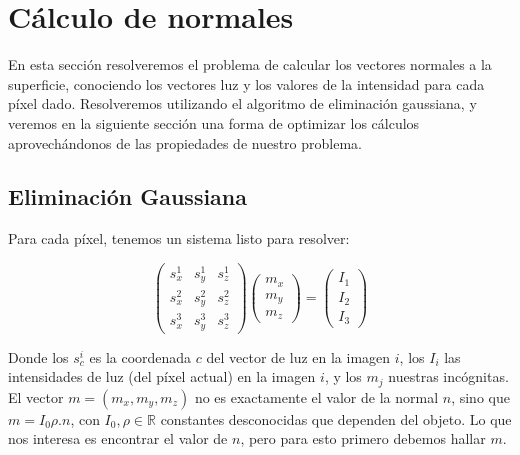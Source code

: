 


\section{Cálculo de normales}

En esta sección resolveremos el problema de calcular los vectores normales a la superficie, conociendo los vectores luz y los valores de la intensidad para cada píxel dado. Resolveremos utilizando el algoritmo de eliminación gaussiana, y veremos en la siguiente sección una forma de optimizar los cálculos aprovechándonos de las propiedades de nuestro problema.

\subsection{Eliminación Gaussiana}

Para cada píxel, tenemos un sistema listo para resolver:

\[
\begin{pmatrix}
    s_{x}^{1} & s_{y}^{1} & s_{z}^{1} \\
    s_{x}^{2} & s_{y}^{2} & s_{z}^{2} \\
    s_{x}^{3} & s_{y}^{3} & s_{z}^{3}
\end{pmatrix}
\begin{pmatrix}
    m_{x} \\
    m_{y} \\
    m_{z}
\end{pmatrix}
=
\begin{pmatrix}
    I_{1} \\
    I_{2} \\
    I_{3}
\end{pmatrix}
\]

Donde los $s_{c}^{i}$ es la coordenada $c$ del vector de luz en la imagen $i$, los $I_i$ las intensidades de luz (del píxel actual) en la imagen $i$, y los $m_j$ nuestras incógnitas. El vector $m = (m_x, m_y, m_z)$ no es exactamente el valor de la normal $n$, sino que $m = I_0 \rho . n$, con $I_0, \rho \in \mathbb{R}$ constantes desconocidas que dependen del objeto. Lo que nos interesa es encontrar el valor de $n$, pero para esto primero debemos hallar $m$. \\

